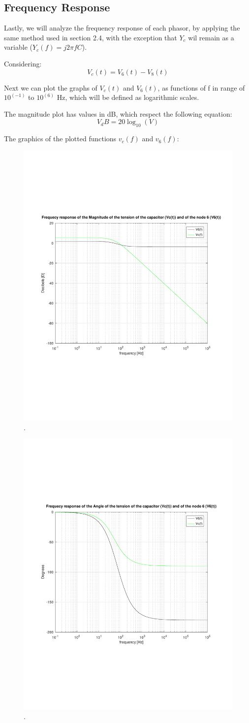 \subsection{Frequency Response}

Lastly, we will analyze the frequency response of each phasor, by applying the same method used in section 2.4, with the exception that $Y_c$ wil remain as a variable ($Y_c(f) = j2\pi fC$).

Considering:
\begin{equation}
	V_c(t) = V_6(t) - V_8(t)
\end{equation} 

Next we can plot the graphs of $V_c(t)$ and $V_6(t)$, as functions of f in range of $10^(-1)$ to $10^(6)$ Hz, which will be defined as logarithmic scales.

The magnitude plot has values in dB, which respect the following equation:
\begin{equation}
	V_dB = 20\log_10(V)
\end{equation}

The graphics of the plotted functions $v_c(f)$ and $v_6(f)$:


\begin{figure}[h] \centering
\includegraphics[width=0.6\linewidth]{magnitude_response.pdf}
\caption{.}
\label{fig:rc4}
\end{figure}



\begin{figure}[h] \centering
\includegraphics[width=0.6\linewidth]{angle_response.pdf}
\caption{.}
\label{fig:rc5}
\end{figure}


